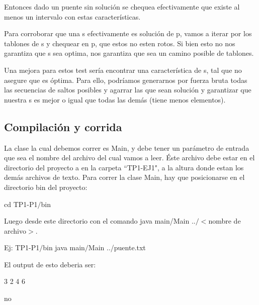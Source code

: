 Entonces dado un puente sin soluci\'on se chequea efectivamente que existe al menos un intervalo con estas caracter\'isticas.

Para corroborar que una s efectivamente es soluci\'on de p, vamos a iterar por los tablones de s y chequear en p, que estos no esten rotos.
Si bien esto no nos garantiza que s sea optima, nos garantiza que sea un camino posible de tablones.

Una mejora para estos test ser\'ia encontrar una caracter\'istica de s, tal que no asegure que es \'optima. Para ello, podr\'iamos generarnos por fuerza bruta todas las secuencias de saltos posibles y agarrar las que sean soluci\'on y garantizar que nuestra s es mejor o igual que todas las dem\'as (tiene menos elementos).

\subsection{Compilaci\'on y corrida}


La clase la cual debemos correr es Main, y debe tener un par\'ametro de entrada que sea el nombre del archivo del cual vamos a leer. \'Este archivo debe estar en el directorio del proyecto a en la carpeta ``TP1-EJ1", a la altura donde estan los dem\'as archivos de texto.
Para correr la clase Main, hay que posicionarse en el directorio bin del proyecto:

cd TP1-P1$/$bin

Luego desde este directorio con el comando java main/Main ..$/$$<$nombre de archivo$>$.

Ej: TP1-P1$/$bin java main$/$Main ../puente.txt

El output de esto deberia ser: 

3 2 4 6

no

 